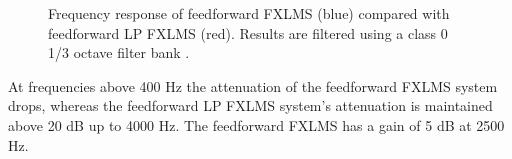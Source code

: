 \begin{figure}[H]
	\centering
	
	\caption{Frequency response of feedforward FXLMS (blue) compared with feedforward LP FXLMS (red). Results are filtered using a class 0 1/3 octave filter bank \cite{OctaveBand}.}
	\label{fig:ANCcompareALL}
\end{figure}        
At frequencies above 400 Hz the attenuation of the feedforward FXLMS system drops, whereas the feedforward LP FXLMS system's attenuation is maintained above 20 dB up to 4000 Hz. The feedforward FXLMS has a gain of 5 dB at 2500 Hz.  
        










